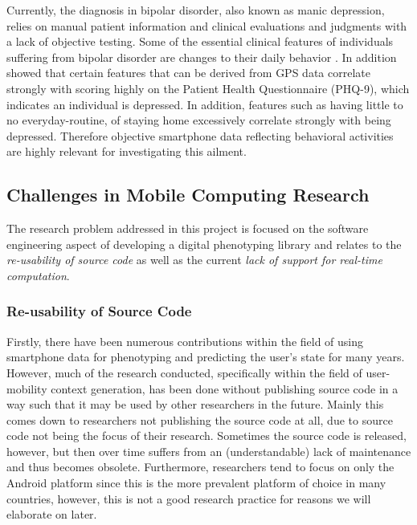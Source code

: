Currently, the diagnosis in bipolar disorder, also known as manic depression, relies on manual patient information and clinical evaluations and judgments with a lack of objective testing. Some of the essential clinical features of individuals suffering from bipolar disorder are changes to their daily behavior \cite{objective_smartphone_data_as_diagnostic_marker}. In addition \cite{Saeb2015} showed that certain features that can be derived from GPS data correlate strongly with scoring highly on the Patient Health Questionnaire (PHQ-9), which indicates an individual is depressed.  In addition, features such as having little to no everyday-routine, of staying home excessively correlate strongly with being depressed. Therefore objective smartphone data reflecting behavioral activities are highly relevant for investigating this ailment.\\

\subsection{Challenges in Mobile Computing Research }
The research problem addressed in this project is focused on the software engineering aspect of developing a digital phenotyping library and relates to the \textit{re-usability of source code} as well as the current \textit{lack of support for real-time computation}. 

\subsubsection{Re-usability of Source Code}
Firstly, there have been numerous contributions within the field of using smartphone data for phenotyping and predicting the user's state for many years. However, much of the research conducted, specifically within the field of user-mobility context generation, has been done without publishing source code in a way such that it may be used by other researchers in the future. Mainly this comes down to researchers not publishing the source code at all, due to source code not being the focus of their research. Sometimes the source code is released, however, but then over time suffers from an (understandable) lack of maintenance and thus becomes obsolete. Furthermore, researchers tend to focus on only the Android platform since this is the more prevalent platform of choice in many countries, however, this is not a good research practice for reasons we will elaborate on later.

